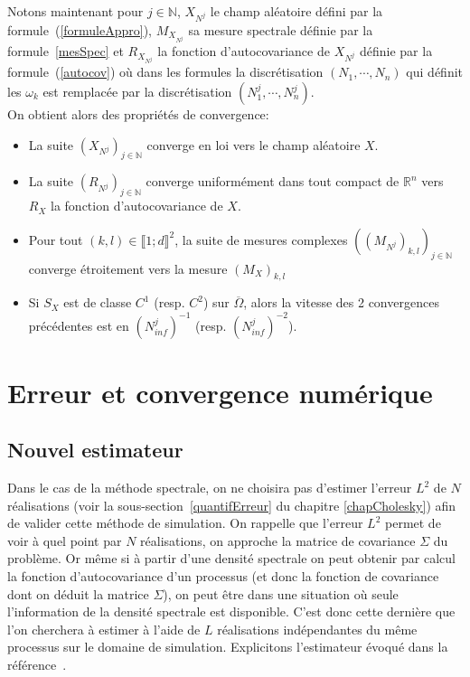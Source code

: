 \noindent Notons maintenant pour $j \in \mathbb{N}$,  $X_{N^j}$ le champ aléatoire défini par la formule~(\ref{formuleAppro}), $M_{X_{N^{j}}}$ sa mesure spectrale définie par
la formule~\ref{mesSpec} et $R_{X_{N^{j}}}$ la fonction d'autocovariance de $X_{N^j}$ définie par la formule~(\ref{autocov})
où dans les formules la discrétisation $(N_1, \cdots, N_n)$ qui définit les $\omega_k$
est remplacée par la discrétisation $(N_1^{j}, \cdots, N_n^{j})$.\\

\noindent On obtient alors des propriétés de convergence:\\


\begin{itemize}
\item La suite $(X_{N^j})_{j \in \mathbb{N}}$ converge en loi vers le champ aléatoire $X$.
\item La suite $(R_{N^j})_{j \in \mathbb{N}}$ converge uniformément dans tout compact de $\mathbb{R}^n$ vers $R_X$ la fonction d'autocovariance de $X$.
\item Pour tout $(k,l) \in \llbracket 1;d \rrbracket^2$, la suite de mesures complexes $((M_{N^j})_{k,l})_{j \in \mathbb{N}}$ converge étroitement vers la mesure $(M_X)_{k,l}$ 
\item Si $S_X$ est de classe $C^1$ (resp. $C^2$) sur $\overline{\Omega}$, alors la vitesse des 2 convergences précédentes est en $(N_{inf}^{j})^{-1}$ (resp. $(N_{inf}^{j})^{-2}$).
\end{itemize}

\section{Erreur et convergence numérique}
\label{erreurConvSpectral}
\subsection{Nouvel estimateur}

Dans le cas de la méthode spectrale, on ne choisira pas d'estimer
l'erreur $L^2$ de $N$ réalisations (voir la sous-section~\ref{quantifErreur}
du chapitre \ref{chapCholesky}) afin de valider cette méthode
de simulation. On rappelle que l'erreur $L^2$ permet de voir à quel point
par $N$ réalisations, on approche la matrice de covariance $\Sigma$ du problème. Or
même si à partir d'une densité spectrale on peut obtenir par calcul la fonction
d'autocovariance d'un processus (et donc la fonction de covariance dont on déduit la matrice $\Sigma$), on
peut être dans une situation où seule l'information de la densité spectrale
est disponible. C'est donc cette dernière que l'on cherchera à estimer à
l'aide de $L$ réalisations indépendantes du même processus sur le domaine
de simulation. Explicitons l'estimateur évoqué dans la référence~\cite{FogliCoursX}.\\

